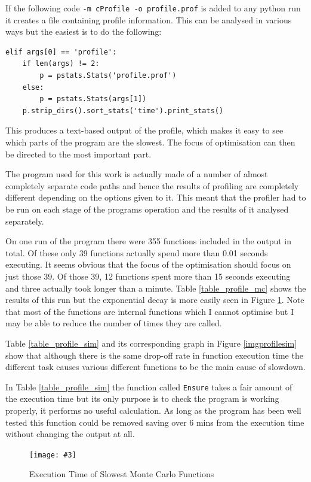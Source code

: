\documentclass[a4paper,oneside,12pt]{report}
\newcommand{\image}[3] {
  \begin{figure}
    \begin{center}
      \texttt{[image: \#3]}
      \caption{#2}
      \label{#1}
    \end{center}
  \end{figure}
}
\begin{document}
If the following code \texttt{-m cProfile -o profile.prof} is added to
any python run it creates a file containing profile information. This can
be analysed in various ways but the easiest is to do the following:

\begin{verbatim}
elif args[0] == 'profile':
    if len(args) != 2:
        p = pstats.Stats('profile.prof')
    else:
        p = pstats.Stats(args[1])
    p.strip_dirs().sort_stats('time').print_stats()
\end{verbatim}

This produces a text-based output of the profile, which makes it easy to
see which parts of the program are the slowest. The focus of
optimisation can then be directed to the most important part.

The program used for this work is actually made of a number of almost completely separate code paths and hence the results of profiling are completely different depending on the options given to it. This meant that the profiler had to be run on each stage of the programs operation and the results of it analysed separately. 

On one run of the program there were 355 functions included in the output in total. Of these only 39 functions actually spend more than 0.01 seconds executing. It seems obvious that the focus of the optimisation should focus on just those 39. Of those 39, 12 functions spent more than 15 seconds executing and three actually took longer than a minute. Table \ref{table_profile_mc} shows the results of this run but the exponential decay is more easily seen in Figure \ref{imgprofilemc}. Note that most of the functions are internal functions which I cannot optimise but I may be able to reduce the number of times they are called.

Table \ref{table_profile_sim} and its corresponding graph in Figure \ref{imgprofilesim} show that although there is the same drop-off rate in function execution time the different task causes various different functions to be the main cause of slowdown. 

In Table \ref{table_profile_sim} the function called \texttt{Ensure} takes a fair amount of the execution time but its only purpose is to check the program is working properly, it performs no useful calculation. As long as the program has been well tested this function could be removed saving over 6 mins from the execution time without changing the output at all.

\image{imgprofilemc}{Execution Time of Slowest Monte Carlo Functions}{profile.png}
\end{document}
